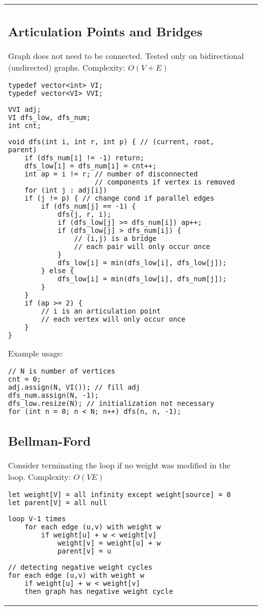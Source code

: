 \documentclass[letterpaper]{article}
\begin{document}
\begin{tabular}{@{}p{9cm}p{9cm}@{}}
\subsection{Articulation Points and Bridges}
Graph does not need to be connected. Tested only on bidirectional (undirected) graphs. Complexity: $O\left(V + E\right)$

\begin{lstlisting}
typedef vector<int> VI;
typedef vector<VI> VVI;

VVI adj;
VI dfs_low, dfs_num;
int cnt;

void dfs(int i, int r, int p) { // (current, root, parent)
	if (dfs_num[i] != -1) return;
	dfs_low[i] = dfs_num[i] = cnt++;
	int ap = i != r; // number of disconnected
	                 // components if vertex is removed
	for (int j : adj[i])
	if (j != p) { // change cond if parallel edges
		if (dfs_num[j] == -1) {
			dfs(j, r, i);
			if (dfs_low[j] >= dfs_num[i]) ap++;
			if (dfs_low[j] > dfs_num[i]) {
				// (i,j) is a bridge
				// each pair will only occur once
			}
			dfs_low[i] = min(dfs_low[i], dfs_low[j]);
		} else {
			dfs_low[i] = min(dfs_low[i], dfs_num[j]);
		}
	}
	if (ap >= 2) {
		// i is an articulation point
		// each vertex will only occur once
	}
}
\end{lstlisting}

Example usage:
\begin{lstlisting}
// N is number of vertices
cnt = 0;
adj.assign(N, VI()); // fill adj
dfs_num.assign(N, -1);
dfs_low.resize(N); // initialization not necessary
for (int n = 0; n < N; n++) dfs(n, n, -1);
\end{lstlisting}

\subsection{Bellman-Ford}

Consider terminating the loop if no weight was modified in the loop. Complexity: $O(VE)$

\begin{lstlisting}
let weight[V] = all infinity except weight[source] = 0
let parent[V] = all null

loop V-1 times
	for each edge (u,v) with weight w
		if weight[u] + w < weight[v]
			weight[v] = weight[u] + w
			parent[v] = u

// detecting negative weight cycles
for each edge (u,v) with weight w
	if weight[u] + w < weight[v]
	then graph has negative weight cycle
\end{lstlisting}

\end{tabular}
\end{document}
